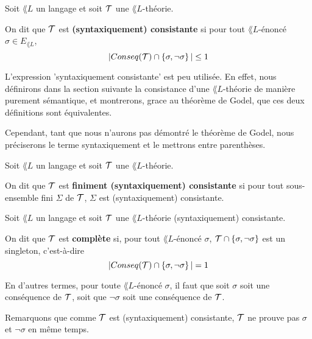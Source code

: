 \documentclass[a4paper, 12pt]{report}
\begin{document}
\begin{definition} 
	Soit $\lang{L}$ un langage et soit $\mathcal{T}$ une $\lang{L}$-théorie.

	On dit que $\mathcal{T}$ est \textbf{(syntaxiquement) consistante} si pour tout $\lang{L}$-énoncé
	$\sigma \in E_{\lang{L}}$,
	\begin{equation}
		|Conseq(\mathcal{T}) \cap \left\{ \sigma, \neg \sigma \right\}| \leq 1
	\end{equation}
\end{definition}

L'expression 'syntaxiquement consistante' est peu utilisée. En effet, nous
définirons dans la section suivante la consistance d'une $\lang{L}$-théorie de
manière purement sémantique, et montrerons, grace au théorème de Godel, que ces
deux définitions sont équivalentes.

Cependant, tant que nous n'aurons pas démontré le théorème de Godel, nous
préciserons le terme syntaxiquement et le mettrons entre parenthèses.

\begin{definition} 
	Soit $\lang{L}$ un langage et soit $\mathcal{T}$ une $\lang{L}$-théorie.

	On dit que $\mathcal{T}$ est \textbf{finiment (syntaxiquement) consistante} si
	pour tout sous-ensemble fini $\Sigma$ de $\mathcal{T}$, $\Sigma$ est
	(syntaxiquement) consistante.
\end{definition}

\begin{definition}
	Soit $\lang{L}$ un langage et soit $\mathcal{T}$ une $\lang{L}$-théorie
	(syntaxiquement) consistante.

	On dit que $\mathcal{T}$ est \textbf{complète} si, pour tout
	$\lang{L}$-énoncé $\sigma$, $\mathcal{T} \cap \left\{ \sigma, \neg \sigma \right\}$
	est un singleton, c'est-à-dire
	\begin{equation}
		|Conseq(\mathcal{T}) \cap \left\{ \sigma, \neg \sigma \right\}| = 1
	\end{equation}

	En d'autres termes, pour toute $\lang{L}$-énoncé $\sigma$, il faut que soit
	$\sigma$ soit une conséquence de $\mathcal{T}$, soit que $\neg \sigma$ soit
	une conséquence de $\mathcal{T}$.

	Remarquons que comme $\mathcal{T}$ est (syntaxiquement) consistante, $\mathcal{T}$ ne prouve
	pas $\sigma$ et $\neg \sigma$ en même temps.
\end{definition}
\end{document}
